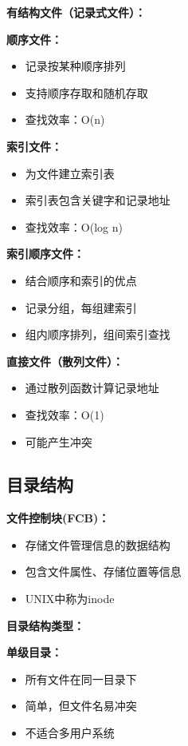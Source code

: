 \documentclass[lang=cn,newtx,10pt,scheme=chinese]{../../elegantbook}
\begin{document}
\textbf{有结构文件（记录式文件）：}

\textbf{顺序文件：}
\begin{itemize}
  \item 记录按某种顺序排列
  \item 支持顺序存取和随机存取
  \item 查找效率：O(n)
\end{itemize}

\textbf{索引文件：}
\begin{itemize}
  \item 为文件建立索引表
  \item 索引表包含关键字和记录地址
  \item 查找效率：O(log n)
\end{itemize}

\textbf{索引顺序文件：}
\begin{itemize}
  \item 结合顺序和索引的优点
  \item 记录分组，每组建索引
  \item 组内顺序排列，组间索引查找
\end{itemize}

\textbf{直接文件（散列文件）：}
\begin{itemize}
  \item 通过散列函数计算记录地址
  \item 查找效率：O(1)
  \item 可能产生冲突
\end{itemize}

\subsection{目录结构}

\textbf{文件控制块(FCB)：}
\begin{itemize}
  \item 存储文件管理信息的数据结构
  \item 包含文件属性、存储位置等信息
  \item UNIX中称为inode
\end{itemize}

\textbf{目录结构类型：}

\textbf{单级目录：}
\begin{itemize}
  \item 所有文件在同一目录下
  \item 简单，但文件名易冲突
  \item 不适合多用户系统
\end{itemize}
\end{document}

